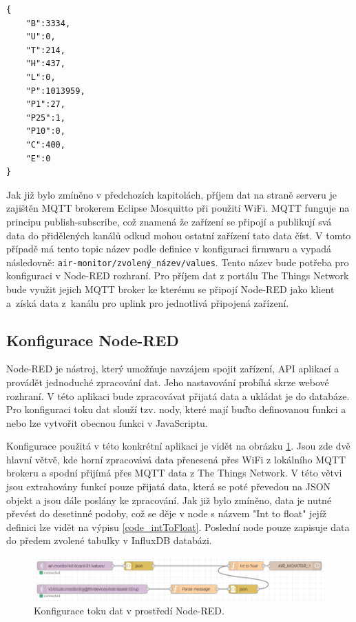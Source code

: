 \noindent
\begin{minipage}{\linewidth}
\begin{lstlisting}[caption={Příklad zasílané JSON zprávy.}, label={code_JSON}]
{
    "B":3334,
    "U":0,
    "T":214,
    "H":437,
    "L":0,
    "P":1013959,
    "P1":27,
    "P25":1,
    "P10":0,
    "C":400,
    "E":0
}
\end{lstlisting}
\end{minipage}

Jak již bylo zmíněno v předchozích kapitolách, příjem dat na straně serveru je zajištěn MQTT brokerem Eclipse Mosquitto při použití WiFi. MQTT funguje na principu publish-subscribe, což znamená že zařízení se připojí a publikují svá data do přidělených kanálů odkud mohou ostatní zařízení tato data číst. V tomto případě má tento topic název podle definice v konfiguraci firmwaru a vypadá následovně: \lstinline{air-monitor/zvolený_název/values}. Tento název bude potřeba pro konfiguraci v Node-RED rozhraní. Pro příjem dat z portálu The Things Network bude využit jejich MQTT broker ke kterému se připojí Node-RED jako klient a~získá data z~kanálu pro uplink pro jednotlivá připojená zařízení.

\subsection{Konfigurace Node-RED}

Node-RED je nástroj, který umožňuje navzájem spojit zařízení, API aplikací a provádět jednoduché zpracování dat. Jeho nastavování probíhá skrze webové rozhraní. V této aplikaci bude zpracovávat přijatá data a ukládat je do databáze. Pro konfiguraci toku dat slouží tzv. nody, které mají buďto definovanou funkci a nebo lze vytvořit obecnou funkci v JavaScriptu.

Konfigurace použitá v této konkrétní aplikaci je vidět na obrázku \ref{fig_NodeRED}. Jsou zde dvě hlavní větvě, kde horní zpracovává data přenesená přes WiFi z lokálního MQTT brokeru a spodní přijímá přes MQTT data z The Things Network. V této větvi jsou extrahovány funkcí pouze přijatá data, která se poté převedou na JSON objekt a jsou dále poslány ke zpracování. Jak již bylo zmíněno, data je nutné převést do desetinné podoby, což se děje v node s názvem "Int to float" jejíž definici lze vidět na výpisu \ref{code_intToFloat}. Poslední node pouze zapisuje data do předem zvolené tabulky v InfluxDB databázi.

\begin{figure}[h]
    \centering
    \includegraphics[width=\textwidth]{obrazky/nodered.png}
    \caption{Konfigurace toku dat v prostředí Node-RED.}
    \label{fig_NodeRED}
\end{figure}

